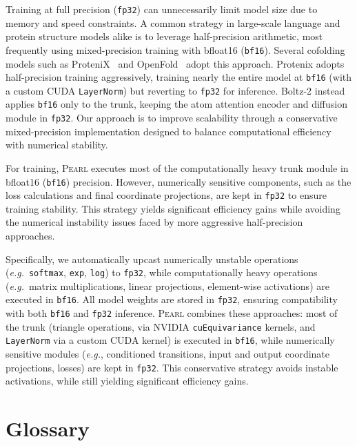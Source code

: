 \documentclass[11pt, letterpaper, onecolumn]{tau-class/tau}
\newcommand{\pearl}{\textsc{Pearl}\xspace}
\newcommand{\boltz}[1]{\mbox{Boltz-#1\xspace}}
\newcommand{\eg}{\textit{e.g.}\xspace}
\newcommand{\cuequivariance}{\texttt{cuEquivariance}\xspace}
\newcommand{\layernorm}{\texttt{LayerNorm}\xspace}
\begin{document}
Training at full precision (\texttt{fp32}) can unnecessarily limit model size due to memory and speed constraints.
A common strategy in large-scale language and protein structure models alike is to leverage half-precision arithmetic, most frequently using mixed-precision training with bfloat16 (\texttt{bf16}).
Several cofolding models such as ProteniX~\cite{bytedance2025protenix} and OpenFold~\cite{ahdritz2024openfold} adopt this approach.
Protenix adopts half-precision training aggressively, training nearly the entire model at \texttt{bf16} (with a custom CUDA \layernorm) but reverting to \texttt{fp32} for inference.
\boltz2 instead applies \texttt{bf16} only to the trunk, keeping the atom attention encoder and diffusion module in \texttt{fp32}. Our approach is to improve scalability through a conservative mixed-precision implementation designed to balance computational efficiency with numerical stability.

For training, \pearl executes most of the computationally heavy trunk module in bfloat16 (\texttt{bf16}) precision. However, numerically sensitive components, such as the loss calculations and final coordinate projections, are kept in \texttt{fp32} to ensure training stability. This strategy yields significant efficiency gains while avoiding the numerical instability issues faced by more aggressive half-precision approaches.

Specifically, we automatically upcast numerically unstable operations (\eg\ \texttt{softmax}, \texttt{exp}, \texttt{log}) to \texttt{fp32}, while computationally heavy operations (\eg\ matrix multiplications, linear projections, element-wise activations) are executed in \texttt{bf16}. All model weights are stored in \texttt{fp32}, ensuring compatibility with both \texttt{bf16} and \texttt{fp32} inference. \pearl combines these approaches: most of the trunk (triangle operations, via NVIDIA \cuequivariance kernels, and \layernorm via a custom CUDA kernel) is executed in \texttt{bf16}, while numerically sensitive modules (\eg, conditioned transitions, input and output coordinate projections, losses) are kept in \texttt{fp32}. This conservative strategy avoids instable activations, while still yielding significant efficiency gains. 


\clearpage
\section{Glossary}
\label{app:glossary}
\end{document}
